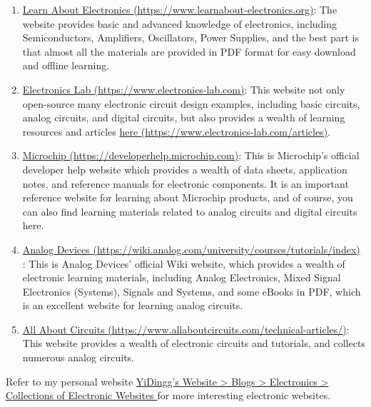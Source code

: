 \documentclass[UTF8]{report}
\begin{document}
\begin{enabstract}
\begin{enumerate}
    \item \href{https://www.learnabout-electronics.org}{  Learn About Electronics  {\color{black} (https://www.learnabout-electronics.org)}}: The website provides basic and advanced knowledge of electronics, including Semiconductors, Amplifiers, Oscillators, Power Supplies, and the best part is that almost all the materials are provided in PDF format for easy download and offline learning.
    
    \item \href{https://www.electronics-lab.com}{  Electronics Lab  {\color{black} (https://www.electronics-lab.com)}}: This website not only open-source many electronic circuit design examples, including basic circuits, analog circuits, and digital circuits, but also provides a wealth of learning resources and articles \href{https://www.electronics-lab.com/articles/}{here {\color{black} (https://www.electronics-lab.com/articles)}}.

    \item \href{https://developerhelp.microchip.com}{  Microchip  {\color{black} (https://developerhelp.microchip.com)}}: This is Microchip's official developer help website which provides a wealth of data sheets, application notes, and reference manuals for electronic components. It is an important reference website for learning about Microchip products, and of course, you can also find learning materials related to analog circuits and digital circuits here. 
    
    \item \href{https://wiki.analog.com/university/courses/tutorials/index}{Analog Devices {\color{black}(https://wiki.analog.com/university/courses/tutorials/index)}} : This is Analog Devices' official Wiki website, which provides a wealth of electronic learning materials, including Analog Electronics, Mixed Signal Electronics (Systems), Signals and Systems, and some eBooks in PDF, which is an excellent website for learning analog circuits.

    \item \href{https://www.allaboutcircuits.com/technical-articles/}{  All About Circuits  {\color{black} (https://www.allaboutcircuits.com/technical-articles/)}}: This website provides a wealth of electronic circuits and tutorials, and collects numerous analog circuits.
\end{enumerate}
    
    Refer to my personal website %
    \href{http://localhost:3000/\#/Blogs/Electronics/Collection\%20of\%20Electronic\%20Websites
    }{ %
    YiDingg's Website > Blogs > Electronics > Collections of Electronic Websites
    } 
    for more interesting electronic websites.


\end{enabstract}
\end{document}
